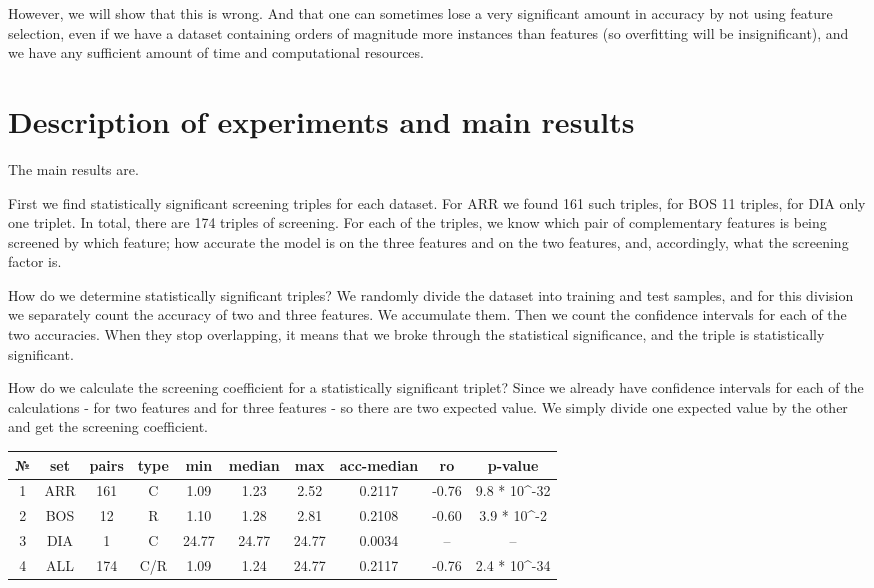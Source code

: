 \documentclass[12pt]{a&t}
\begin{document}
However, we will show that this is wrong. And that one can sometimes lose a very significant amount in accuracy by not using feature selection, even if we have a dataset containing orders of magnitude more instances than features (so overfitting will be insignificant), and we have any sufficient amount of time and computational resources.

\section{Description of experiments and main results}
The main results are.

First we find statistically significant screening triples for each dataset. For ARR we found 161 such triples, for BOS 11 triples, for DIA only one triplet. In total, there are 174 triples of screening. For each of the triples, we know which pair of complementary features is being screened by which feature; how accurate the model is on the three features and on the two features, and, accordingly, what the screening factor is.

How do we determine statistically significant triples? We randomly divide the dataset into training and test samples, and for this division we separately count the accuracy of two and three features. We accumulate them. Then we count the confidence intervals for each of the two accuracies. When they stop overlapping, it means that we broke through the statistical significance, and the triple is statistically significant. 

How do we calculate the screening coefficient for a statistically significant triplet? Since we already have confidence intervals for each of the calculations - for two features and for three features - so there are two expected value. We simply divide one expected value by the other and get the screening coefficient. 

\begin{center}
\begin{tabular}{ |c||c|c|c|c|c|c|c|c|c| } 
  \hline
  № & set & pairs & type & min & median & max & acc-median & ro & p-value \\
 \hline
 \hline
 1 & ARR & 161 & C & 1.09 & 1.23 & 2.52 & 0.2117 & -0.76 & 9.8 * 10^{-32} \\ 
 2 & BOS & 12 & R & 1.10 & 1.28 & 2.81 & 0.2108 & -0.60 & 3.9 * 10^{-2} \\ 
 3 & DIA & 1 & C& 24.77 & 24.77 & 24.77 & 0.0034 & -- & --\\ 
 4 & ALL & 174 & C/R & 1.09 & 1.24 & 24.77 & 0.2117 & -0.76 & 2.4 * 10^{-34} \\ 
 \hline
\end{tabular}
\end{center}
\end{document}
